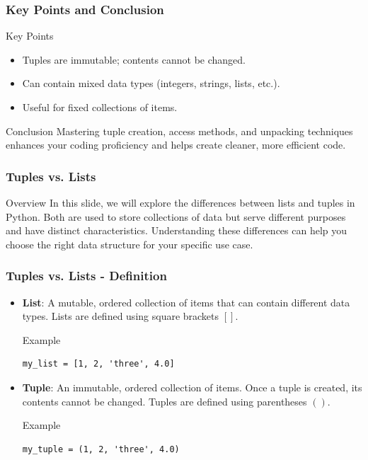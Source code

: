 \documentclass{beamer}
\begin{document}
\begin{frame}[fragile]
    \frametitle{Key Points and Conclusion}
    \begin{block}{Key Points}
        \begin{itemize}
            \item Tuples are immutable; contents cannot be changed.
            \item Can contain mixed data types (integers, strings, lists, etc.).
            \item Useful for fixed collections of items.
        \end{itemize}
    \end{block}
    
    \begin{block}{Conclusion}
        Mastering tuple creation, access methods, and unpacking techniques enhances your coding proficiency and helps create cleaner, more efficient code.
    \end{block}
\end{frame}

\begin{frame}
    \frametitle{Tuples vs. Lists}
    \begin{block}{Overview}
        In this slide, we will explore the differences between lists and tuples in Python. 
        Both are used to store collections of data but serve different purposes and have distinct characteristics. 
        Understanding these differences can help you choose the right data structure for your specific use case.
    \end{block}
\end{frame}

\begin{frame}[fragile]
    \frametitle{Tuples vs. Lists - Definition}
    \begin{itemize}
        \item \textbf{List}: A mutable, ordered collection of items that can contain different data types. Lists are defined using square brackets $[]$.
        \begin{block}{Example}
            \begin{lstlisting}
my_list = [1, 2, 'three', 4.0]
            \end{lstlisting}
        \end{block}
        
        \item \textbf{Tuple}: An immutable, ordered collection of items. Once a tuple is created, its contents cannot be changed. Tuples are defined using parentheses $()$.
        \begin{block}{Example}
            \begin{lstlisting}
my_tuple = (1, 2, 'three', 4.0)
            \end{lstlisting}
        \end{block}
    \end{itemize}
\end{frame}
\end{document}
